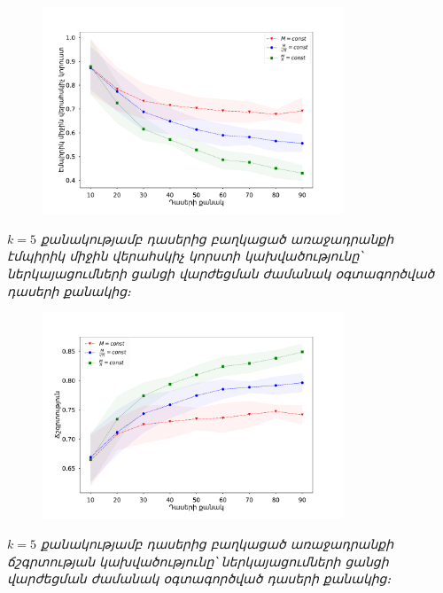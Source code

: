 \documentclass[10pt]{beamer}
\begin{document}
\begin{frame}
\begin{figure}[htp]
\centering
\includegraphics[width=0.8\textwidth]{imgs/k=5.pdf}
\end{figure}
\begin{center}
 \fontsize{7pt}{7pt} 
\armfont \textit{$k=5$ քանակությամբ դասերից բաղկացած առաջադրանքի էմպիրիկ միջին վերահսկիչ կորստի կախվածությունը՝ ներկայացումների ցանցի վարժեցման ժամանակ  օգտագործված դասերի քանակից։}
\end{center}
\end{frame}


\begin{frame}
\begin{figure}[htp]
\centering
\includegraphics[width=0.8\textwidth]{imgs/k=5_acc.pdf}
\end{figure}
\begin{center}
 \fontsize{7pt}{7pt} 
\armfont \textit{$k=5$ քանակությամբ դասերից բաղկացած առաջադրանքի ճշգրտության կախվածությունը՝ ներկայացումների ցանցի վարժեցման ժամանակ  օգտագործված դասերի քանակից։}
\end{center}
\end{frame}
\end{document}

